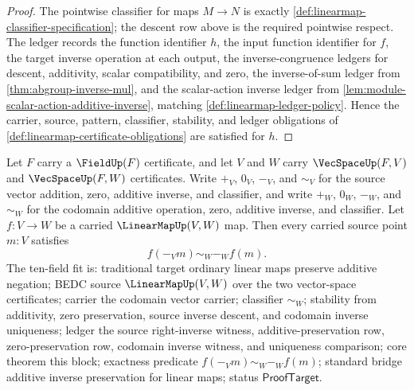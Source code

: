 \begin{proof}
The pointwise classifier for maps $M\to N$ is exactly \autoref{def:linearmap-classifier-specification}; the descent row above is the required pointwise respect. The ledger records the function identifier $h$, the input function identifier for $f$, the target inverse operation at each output, the inverse-congruence ledgers for descent, additivity, scalar compatibility, and zero, the inverse-of-sum ledger from \autoref{thm:abgroup-inverse-mul}, and the scalar-action inverse ledger from \autoref{lem:module-scalar-action-additive-inverse}, matching \autoref{def:linearmap-ledger-policy}. Hence the carrier, source, pattern, classifier, stability, and ledger obligations of \autoref{def:linearmap-certificate-obligations} are satisfied for $h$.
\end{proof}

\begin{theorem}
\label{thm:linearmap-additive-inverse-preservation}
Let $F$ carry a $\FieldUp(F)$ certificate, and let $V$ and $W$ carry $\VecSpaceUp(F,V)$ and $\VecSpaceUp(F,W)$ certificates. Write $+_V$, $0_V$, $-_V$, and $\sim_V$ for the source vector addition, zero, additive inverse, and classifier, and write $+_W$, $0_W$, $-_W$, and $\sim_W$ for the codomain additive operation, zero, additive inverse, and classifier. Let $f:V\to W$ be a carried $\LinearMapUp(V,W)$ map. Then every carried source point $m:V$ satisfies
$$
f(-_V m)\sim_W-_W f(m).
$$
The ten-field fit is: traditional target ordinary linear maps preserve additive negation; BEDC source $\LinearMapUp(V,W)$ over the two vector-space certificates; carrier the codomain vector carrier; classifier $\sim_W$; stability from additivity, zero preservation, source inverse descent, and codomain inverse uniqueness; ledger the source right-inverse witness, additive-preservation row, zero-preservation row, codomain inverse witness, and uniqueness comparison; core theorem this block; exactness predicate $f(-_V m)\sim_W-_W f(m)$; standard bridge additive inverse preservation for linear maps; status $\mathsf{ProofTarget}$.
\end{theorem}
